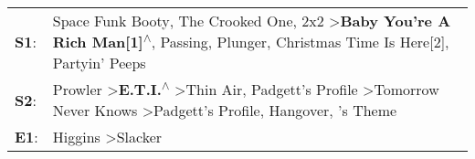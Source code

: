 \begin{supertabular}{p{0.03\textwidth}p{0.92\textwidth}}
 \textbf{S1}:  &                   Space Funk Booty\textsuperscript{}, \enspace The Crooked One\textsuperscript{}, \enspace 2x2\textsuperscript{} \textgreater \enspace \textbf{Baby You're A Rich Man[1]\textsuperscript{$\wedge$}}, \enspace Passing\textsuperscript{}, \enspace Plunger\textsuperscript{}, \enspace Christmas Time Is Here[2]\textsuperscript{}, \enspace Partyin' Peeps\textsuperscript{}  \enspace  \\
 \textbf{S2}:  &  Prowler\textsuperscript{} \textgreater \enspace \textbf{E.T.I.\textsuperscript{$\wedge$}} \textgreater \enspace Thin Air\textsuperscript{}, \enspace Padgett's Profile\textsuperscript{} \textgreater \enspace Tomorrow Never Knows\textsuperscript{} \textgreater \enspace Padgett's Profile\textsuperscript{}, \enspace Hangover\textsuperscript{}, 's Theme\textsuperscript{}  \enspace  \\
 \textbf{E1}:  &                                                                                                                                                                                                                                                                                                                    Higgins\textsuperscript{} \textgreater \enspace Slacker\textsuperscript{}  \enspace  \\
\end{supertabular}
